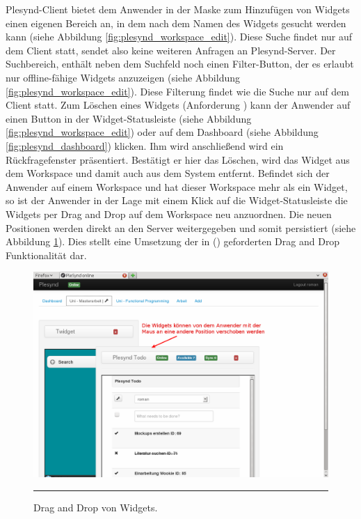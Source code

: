 Plesynd-Client bietet dem Anwender in der Maske zum Hinzufügen von Widgets einen eigenen Bereich an, in dem nach dem Namen des Widgets gesucht werden kann (siehe Abbildung \ref{fig:plesynd_workspace_edit}). Diese Suche findet nur auf dem Client statt, sendet also keine weiteren Anfragen an Plesynd-Server. Der Suchbereich, enthält neben dem Suchfeld noch einen Filter-Button, der es erlaubt nur offline-fähige Widgets anzuzeigen (siehe Abbildung \ref{fig:plesynd_workspace_edit}). Diese Filterung findet wie die Suche nur auf dem Client statt. Zum Löschen eines Widgets (Anforderung  \emph{\requirementWidgetDelete}) kann der Anwender auf einen Button in der Widget-Statusleiste (siehe Abbildung \ref{fig:plesynd_workspace_edit}) oder auf dem Dashboard (siehe Abbildung \ref{fig:plesynd_dashboard}) klicken. Ihm wird anschließend wird ein Rückfragefenster präsentiert. Bestätigt er hier das Löschen, wird das Widget aus dem Workspace und damit auch aus dem System entfernt. Befindet sich der Anwender auf einem Workspace und hat dieser Workspace mehr als ein Widget, so ist der Anwender in der Lage mit einem Klick auf die Widget-Statusleiste die Widgets per Drag and Drop auf dem Workspace neu anzuordnen. Die neuen Positionen werden direkt an den Server weitergegeben und somit persistiert (siehe Abbildung \ref{fig:plesynd_drag_and_drop}). Dies stellt eine Umsetzung der in  (\emph{\requirementWidgetSortDragNDrop}) geforderten Drag and Drop Funktionalität dar. 
\begin{figure}[H]
  \centering
  \includegraphics[width=\textwidth]{./Figures/plesynd_drag_and_drop.png}
    \rule{35em}{0.5pt}
  \caption[Plesynd User"=Interface: Drag and Drop von Widgets]{Drag and Drop von Widgets.}
  \label{fig:plesynd_drag_and_drop}
\end{figure}
